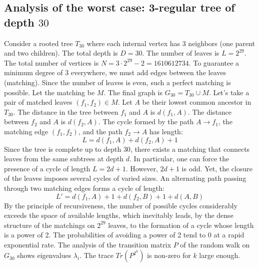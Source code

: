 \documentclass[12pt,a4paper]{article}
\begin{document}
\subsection{Analysis of the worst case: 3-regular tree of depth $30$}
Consider a rooted tree $T_{30}$ where each internal vertex has 3 neighbors (one parent and two children).
The total depth is $D = 30$.
The number of leaves is $L = 2^{29}$.
The total number of vertices is $N = 3 \cdot 2^{29} - 2 = 1610612734$.
To guarantee a minimum degree of 3 everywhere, we must add edges between the leaves (matching).
Since the number of leaves is even, such a perfect matching is possible.
Let the matching be $M$. The final graph is $G_{30} = T_{30} \cup M$.
Let's take a pair of matched leaves $(f_1, f_2) \in M$.
Let $A$ be their lowest common ancestor in $T_{30}$.
The distance in the tree between $f_1$ and $A$ is $d(f_1, A)$.
The distance between $f_2$ and $A$ is $d(f_2, A)$.
The cycle formed by the path $A \to f_1$, the matching edge $(f_1, f_2)$, and the path $f_2 \to A$ has length:
$$ L = d(f_1, A) + d(f_2, A) + 1 $$
Since the tree is complete up to depth $30$, there exists a matching that connects leaves from the same subtrees at depth $d$.
In particular, one can force the presence of a cycle of length $L = 2d + 1$. However, $2d+1$ is odd.
Yet, the closure of the leaves imposes several cycles of varied sizes. An alternating path passing through two matching edges forms a cycle of length:
$$ L' = d(f_1, A) + 1 + d(f_2, B) + 1 + d(A, B) $$
By the principle of recursiveness, the number of possible cycles considerably exceeds the space of available lengths, which inevitably leads, by the dense structure of the matchings on $2^{29}$ leaves, to the formation of a cycle whose length is a power of 2. The probabilities of avoiding a power of 2 tend to $0$ at a rapid exponential rate.
The analysis of the transition matrix $P$ of the random walk on $G_{30}$ shows eigenvalues $\lambda_i$. The trace $Tr(P^{2^k})$ is non-zero for $k$ large enough.
\end{document}
